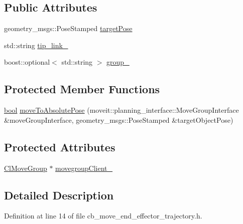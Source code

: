 \subsection*{Public Attributes}
\begin{DoxyCompactItemize}
\item 
geometry\+\_\+msgs\+::\+Pose\+Stamped \hyperlink{classcl__move__group__interface_1_1CbMoveEndEffectorTrajectory_a6639fe94f79ff4b7e3b759acd043e883}{target\+Pose}
\item 
std\+::string \hyperlink{classcl__move__group__interface_1_1CbMoveEndEffectorTrajectory_a2163c420c6eff60e087ac8863d0860a1}{tip\+\_\+link\+\_\+}
\item 
boost\+::optional$<$ std\+::string $>$ \hyperlink{classcl__move__group__interface_1_1CbMoveEndEffectorTrajectory_aa247cf74c1d4878bacecba836a839fa7}{group\+\_\+}
\end{DoxyCompactItemize}
\subsection*{Protected Member Functions}
\begin{DoxyCompactItemize}
\item 
\hyperlink{classbool}{bool} \hyperlink{classcl__move__group__interface_1_1CbMoveEndEffectorTrajectory_a7fabd5f9c44b5a6c602ebee1f9aa4463}{move\+To\+Absolute\+Pose} (moveit\+::planning\+\_\+interface\+::\+Move\+Group\+Interface \&move\+Group\+Interface, geometry\+\_\+msgs\+::\+Pose\+Stamped \&target\+Object\+Pose)
\end{DoxyCompactItemize}
\subsection*{Protected Attributes}
\begin{DoxyCompactItemize}
\item 
\hyperlink{classcl__move__group__interface_1_1ClMoveGroup}{Cl\+Move\+Group} $\ast$ \hyperlink{classcl__move__group__interface_1_1CbMoveEndEffectorTrajectory_aea650d3e7836125b32be97392b71a7f3}{movegroup\+Client\+\_\+}
\end{DoxyCompactItemize}


\subsection{Detailed Description}


Definition at line 14 of file cb\+\_\+move\+\_\+end\+\_\+effector\+\_\+trajectory.\+h.



